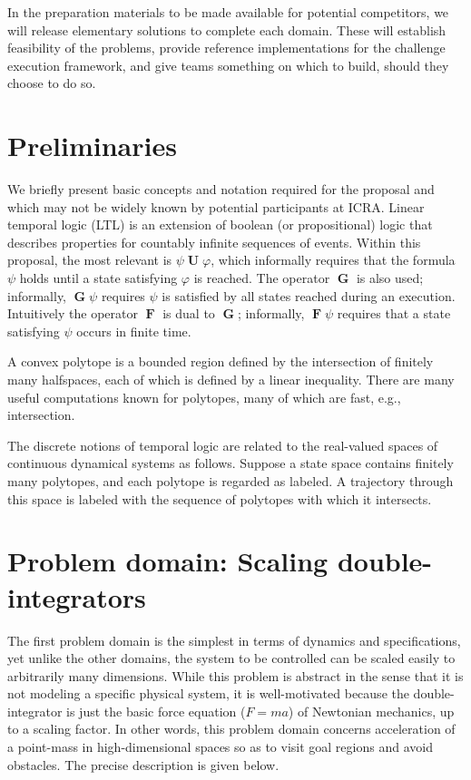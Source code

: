 \documentclass[12pt]{amsart}
\DeclareMathOperator{\Galways}{\mathbf{G}}
\DeclareMathOperator{\Feventually}{\mathbf{F}}
\DeclareMathOperator{\Uuntil}{\mathbf{U}}
\theoremstyle{definition}
\begin{document}
In the preparation materials to be made available for potential competitors, we
will release elementary solutions to complete each domain.  These will establish
feasibility of the problems, provide reference implementations for the challenge
execution framework, and give teams something on which to build, should they
choose to do so.


\section{Preliminaries}

We briefly present basic concepts and notation required for the proposal and
which may not be widely known by potential participants at ICRA.  Linear
temporal logic (LTL) is an extension of boolean (or propositional) logic that
describes properties for countably infinite sequences of events.  Within this
proposal, the most relevant is $\psi \Uuntil \varphi$, which informally requires
that the formula $\psi$ holds until a state satisfying $\varphi$ is reached.
The operator $\Galways$ is also used; informally, $\Galways \psi$ requires
$\psi$ is satisfied by all states reached during an execution.  Intuitively the
operator $\Feventually$ is dual to $\Galways$; informally, $\Feventually \psi$
requires that a state satisfying $\psi$ occurs in finite time.

A convex polytope is a bounded region defined by the intersection of finitely
many halfspaces, each of which is defined by a linear inequality.  There are
many useful computations known for polytopes, many of which are fast, e.g.,
intersection. \cite{Fukuda2004}

The discrete notions of temporal logic are related to the real-valued spaces of
continuous dynamical systems as follows.  Suppose a state space contains
finitely many polytopes, and each polytope is regarded as labeled.  A trajectory
through this space is labeled with the sequence of polytopes with which it
intersects.


\section{Problem domain: Scaling double-integrators}\label{sec:scalingdoubleinteg}

The first problem domain is the simplest in terms of dynamics and
specifications, yet unlike the other domains, the system to be controlled can be
scaled easily to arbitrarily many dimensions.  While this problem is abstract in
the sense that it is not modeling a specific physical system, it is
well-motivated because the double-integrator is just the basic force equation
($F=ma$) of Newtonian mechanics, up to a scaling factor.  In other words, this
problem domain concerns acceleration of a point-mass in high-dimensional spaces
so as to visit goal regions and avoid obstacles.  The precise description is
given below.
\end{document}
